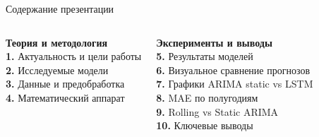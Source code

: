 \begin{frame}{Содержание презентации}
  \begin{columns}[t]
    \begin{tcolorbox}[infobox, equal height group=outline]
      \textbf{\color{primary}Теория и методология}\\[6pt]
      \small
      \textcolor{accent}{\textbf{1.}} Актуальность и цели работы\\[3pt]
      \textcolor{accent}{\textbf{2.}} Исследуемые модели\\[3pt]
      \textcolor{accent}{\textbf{3.}} Данные и предобработка\\[3pt]
      \textcolor{accent}{\textbf{4.}} Математический аппарат
    \end{tcolorbox}

    \begin{tcolorbox}[infobox, equal height group=outline]
      \textbf{\color{primary}Эксперименты и выводы}\\[6pt]
      \small
      \textcolor{accent}{\textbf{5.}} Результаты моделей\\[3pt]
      \textcolor{accent}{\textbf{6.}} Визуальное сравнение прогнозов\\[3pt]
      \textcolor{accent}{\textbf{7.}} Графики ARIMA static vs LSTM\\[3pt]
      \textcolor{accent}{\textbf{8.}} MAE по полугодиям\\[3pt]
      \textcolor{accent}{\textbf{9.}} Rolling vs Static ARIMA\\[3pt]
      \textcolor{accent}{\textbf{10.}} Ключевые выводы
    \end{tcolorbox}
  \end{columns}
\end{frame}
